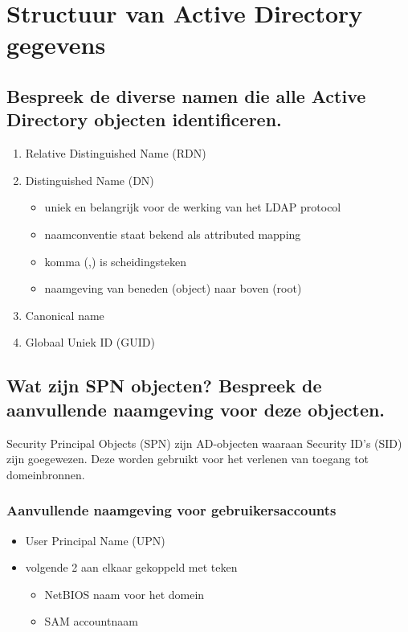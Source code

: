\chapter{Structuur van Active Directory gegevens}

\section{Bespreek de diverse namen die alle Active Directory objecten
identificeren.}

\begin{enumerate}
	\item Relative Distinguished Name (RDN)
	\item Distinguished Name (DN)
		\begin{itemize}
			\item uniek en belangrijk voor de werking van het LDAP protocol
			\item naamconventie staat bekend als attributed mapping
			\item komma (,) is scheidingsteken
			\item naamgeving van beneden (object) naar boven (root)
		\end{itemize}
	\item Canonical name
	\item Globaal Uniek ID (GUID)
\end{enumerate}

\section{Wat zijn SPN objecten? Bespreek de aanvullende naamgeving voor deze
objecten.}

Security Principal Objects (SPN) zijn AD-objecten waaraan Security ID's (SID)
zijn goegewezen. Deze worden gebruikt voor het verlenen van toegang tot
domeinbronnen.

\subsection{Aanvullende naamgeving voor gebruikersaccounts}

\begin{itemize}
	\item User Principal Name (UPN)
	\item volgende 2 aan elkaar gekoppeld met \-teken
		\begin{itemize}
			\item NetBIOS naam voor het domein
			\item SAM accountnaam
		\end{itemize}
\end{itemize}

